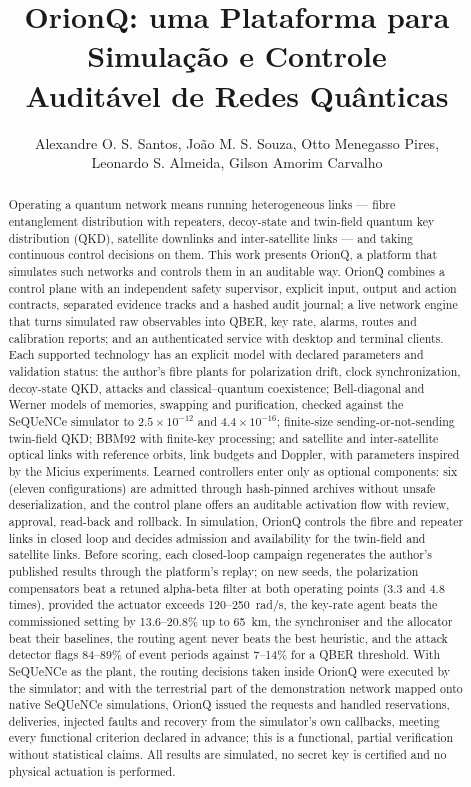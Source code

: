 \documentclass[12pt]{article}
\title{OrionQ: uma Plataforma para Simulação e Controle\\
Auditável de Redes Quânticas}
\author{Alexandre O. S. Santos\inst{1,2,3}, João M. S. Souza\inst{2,3}, Otto Menegasso Pires\inst{2,3},\\
Leonardo S. Almeida\inst{1}, Gilson Amorim Carvalho\inst{1}}
\begin{document}
\maketitle

\begin{abstract}
Operating a quantum network means running heterogeneous links --- fibre
entanglement distribution with repeaters, decoy-state and twin-field quantum
key distribution (QKD), satellite downlinks and inter-satellite links --- and
taking continuous control decisions on them. This work presents OrionQ, a
platform that simulates such networks and controls them in an auditable way.
OrionQ combines a control plane with an independent safety supervisor, explicit
input, output and action contracts, separated evidence tracks and a hashed
audit journal; a live network engine that turns simulated raw observables into
QBER, key rate, alarms, routes and calibration reports; and an authenticated
service with desktop and terminal clients. Each supported technology has an
explicit model with declared parameters and validation status: the author's
fibre plants for polarization drift, clock synchronization, decoy-state QKD,
attacks and classical--quantum coexistence; Bell-diagonal and Werner models of
memories, swapping and purification, checked against the SeQUeNCe simulator to
$2.5\times10^{-12}$ and $4.4\times10^{-16}$; finite-size sending-or-not-sending
twin-field QKD; BBM92 with finite-key processing; and satellite and
inter-satellite optical links with reference orbits, link budgets and Doppler,
with parameters inspired by the Micius experiments. Learned controllers enter only as
optional components: six (eleven configurations) are admitted through
hash-pinned archives without unsafe deserialization, and the control plane
offers an auditable activation flow with review, approval, read-back and
rollback. In simulation, OrionQ controls the fibre and repeater links in closed
loop and decides admission and availability for the twin-field and satellite
links. Before scoring, each closed-loop campaign
regenerates the author's published results through the platform's replay; on
new seeds, the polarization compensators beat a retuned alpha-beta filter at
both operating points (3.3 and 4.8 times), provided the actuator exceeds
120--250~rad/s, the key-rate agent beats the
commissioned setting by 13.6--20.8\% up to 65~km, the synchroniser and the
allocator beat their baselines, the routing agent never beats the best
heuristic, and the attack detector flags 84--89\% of event periods against
7--14\% for a QBER threshold. With SeQUeNCe as the plant, the routing
decisions taken inside OrionQ were executed by the simulator; and with the
terrestrial part of the demonstration network mapped onto native SeQUeNCe
simulations, OrionQ issued the requests and handled reservations, deliveries,
injected faults and recovery from the simulator's own callbacks, meeting every
functional criterion declared in advance; this is a functional, partial
verification without statistical claims. All results are simulated, no secret
key is certified and no physical actuation is performed.
\end{abstract}
\end{document}
